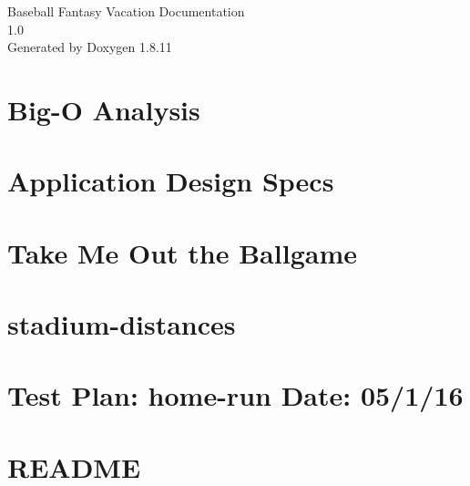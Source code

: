 \documentclass[twoside]{book}
\newcommand{\+}{\discretionary{\mbox{\scriptsize$\hookleftarrow$}}{}{}}
\newcommand{\clearemptydoublepage}{%
  \newpage{\pagestyle{empty}\cleardoublepage}%
}
\begin{document}
\hypersetup{pageanchor=false,
             bookmarksnumbered=true,
             pdfencoding=unicode
            }
\begin{titlepage}
\vspace*{7cm}
\begin{center}%
{\Large Baseball Fantasy Vacation Documentation \\[1ex]\large 1.\+0 }\\
\vspace*{1cm}
{\large Generated by Doxygen 1.8.11}\\
\end{center}
\end{titlepage}
\clearemptydoublepage
\tableofcontents
\clearemptydoublepage
{}
\hypersetup{pageanchor=true}

\chapter{Big-\/O Analysis}
\label{md_docs_Big-O-Analysis}
\hypertarget{md_docs_Big-O-Analysis}{}

\chapter{Application Design Specs}
\label{md_docs_design}
\hypertarget{md_docs_design}{}

\chapter{Take Me Out the Ballgame}
\label{md_docs_Project-Instructions}
\hypertarget{md_docs_Project-Instructions}{}

\chapter{stadium-\/distances}
\label{md_docs_stadium-distances}
\hypertarget{md_docs_stadium-distances}{}

\chapter{Test Plan\+: home-\/run Date\+: 05/1/16}
\label{md_docs_Test_Plan}
\hypertarget{md_docs_Test_Plan}{}

\chapter{R\+E\+A\+D\+ME}
\label{md_README}
\hypertarget{md_README}{}

\end{document}

